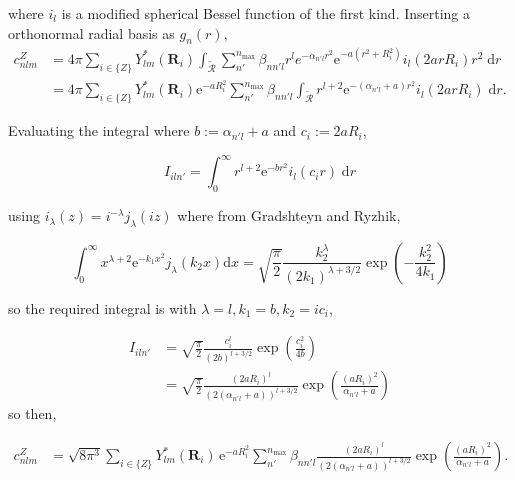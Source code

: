 \documentclass[../main.tex]{subfiles}
\begin{document}
where $i_l$ is a modified spherical Bessel function of the first kind. Inserting a orthonormal radial basis as $g_n(r)$,
\begin{equation}
	\begin{split}
		c_{nlm}^Z &=4\pi \sum_{i \in \{Z\}}Y_{lm}^*(\boldsymbol{R}_i) \int_\mathcal{\tilde{R}} \sum_{n'}^{n_\text{max}} \beta_{nn'l}r^l e^{-\alpha_{n'l}r^2}\text{e}^{-a(r^2+R_i^2)} i_l(2arR_i)r^2\; \text{d}r \\
		&= 4\pi \sum_{i \in \{Z\}}Y_{lm}^*(\boldsymbol{R}_i)\text{e}^{-aR_i^2} \sum_{n'}^{n_\text{max}} \beta_{nn'l}\int_\mathcal{\tilde{R}} r^{l + 2}  \text{e}^{-(\alpha_{n'l} + a)r^2} i_l(2arR_i)\; \text{d}r.
	\end{split}
\end{equation}

Evaluating the integral where $b  := \alpha_{n'l} + a$ and $c_i:= 2aR_i$,

\begin{equation}
	I_{iln'} = \int_0^\infty r^{l+2} \text{e}^{-br^2}i_l(c_i r)\; \text{d}r
\end{equation}

using $i_\lambda(z) = i^{-\lambda}j_\lambda(iz)$ where from Gradshteyn and Ryzhik,\cite{Gradshteyn2007} 

\[\int_0^\infty x^{\lambda + 2}\text{e}^{-k_1x^2}j_\lambda(k_2x) \text{d}x =  
\sqrt{\frac{\pi}{2}} \frac{k_2^\lambda}{(2k_1)^{\lambda + 3/2}}\exp\left(-\frac{k_2^2}{4k_1}\right)\]

so the required integral is with $\lambda = l, k_1 = b, k_2 = ic_i$,

\begin{equation}
	\begin{split}
		I_{iln'} &= \sqrt{\frac{\pi}{2}} \frac{c_i^l}{(2b)^{l+3/2}}\exp\left(\frac{c_i^2}{4b}\right) \\
		&=  \sqrt{\frac{\pi}{2}} \frac{(2aR_i)^l}{(2(\alpha_{n'l} + a))^{l+3/2}}\exp\left(\frac{(aR_i)^2}{\alpha_{n'l} + a}\right)
	\end{split}
\end{equation}
so then,

\begin{equation}
	\begin{split}
		c_{nlm}^Z &= \sqrt{8\pi^3} \sum_{i \in \{Z\}}Y_{lm}^*(\boldsymbol{R}_i)\,\text{e}^{-aR_i^2} \sum_{n'}^{n_\text{max}} \beta_{nn'l} \frac{(2aR_i)^l}{(2(\alpha_{n'l} + a))^{l+3/2}}\exp\left(\frac{(aR_i)^2}{\alpha_{n'l} + a}\right).
	\end{split}
\end{equation}
\end{document}
